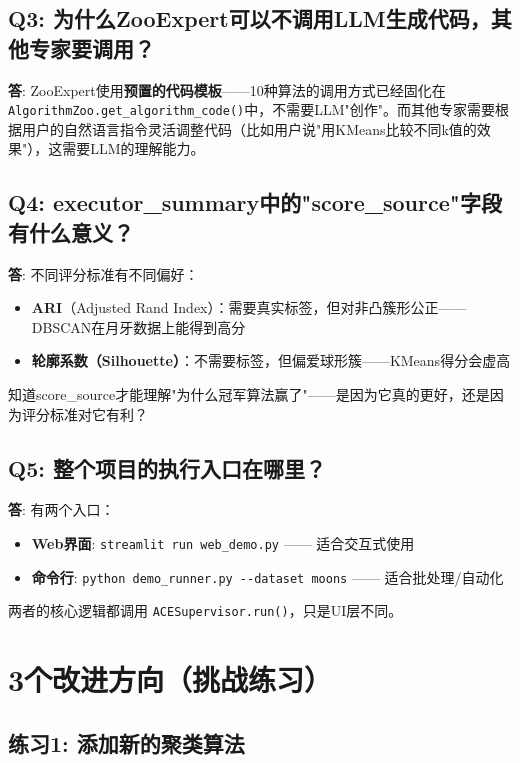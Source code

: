 \documentclass[11pt,a4paper]{ctexbook}
\begin{document}
\subsection{Q3: 为什么ZooExpert可以不调用LLM生成代码，其他专家要调用？}

\textbf{答}: ZooExpert使用\textbf{预置的代码模板}——10种算法的调用方式已经固化在\verb|AlgorithmZoo.get_algorithm_code()|中，不需要LLM"创作"。而其他专家需要根据用户的自然语言指令灵活调整代码（比如用户说"用KMeans比较不同k值的效果"），这需要LLM的理解能力。

\subsection{Q4: executor\_summary中的"score\_source"字段有什么意义？}

\textbf{答}: 不同评分标准有不同偏好：
\begin{itemize}
    \item \textbf{ARI}（Adjusted Rand Index）：需要真实标签，但对非凸簇形公正——DBSCAN在月牙数据上能得到高分
    \item \textbf{轮廓系数（Silhouette）}：不需要标签，但偏爱球形簇——KMeans得分会虚高
\end{itemize}
知道score\_source才能理解"为什么冠军算法赢了"——是因为它真的更好，还是因为评分标准对它有利？

\subsection{Q5: 整个项目的执行入口在哪里？}

\textbf{答}: 有两个入口：
\begin{itemize}
    \item \textbf{Web界面}: \verb|streamlit run web_demo.py| —— 适合交互式使用
    \item \textbf{命令行}: \verb|python demo_runner.py --dataset moons| —— 适合批处理/自动化
\end{itemize}
两者的核心逻辑都调用 \verb|ACESupervisor.run()|，只是UI层不同。

\section{3个改进方向（挑战练习）}

\subsection{练习1: 添加新的聚类算法}
\end{document}
